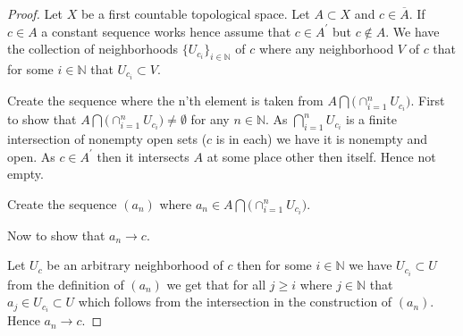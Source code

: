 \documentclass{amsart}
\theoremstyle{plain}
\theoremstyle{definition}
\theoremstyle{remark}
\begin{document}
\begin{proof}
    
    Let $X$ be a first countable topological space. Let $A\subset X$ and $c\in \overline A$. If $c\in A$ a constant sequence works hence assume that $c\in A^\prime$ but $c\not \in A$. We have the collection of neighborhoods $\{U_{c_i}\}_{i\in \mathbb{N}}$ of $c$ where any neighborhood $V$ of $c$ that for some $i\in \mathbb{N}$ that $U_{c_i}\subset V$.

    Create the sequence where the n'th element is taken from $A\bigcap \big(\cap_{i=1}^n U_{c_i} \big)$. First to show that $A\bigcap \big(\cap_{i=1}^n U_{c_i} \big)\not = \emptyset$ for any $n\in \mathbb{N}$. As $\bigcap_{i=1}^nU_{c_i}$ is a finite intersection of nonempty open sets  ($c$ is in each) we have it is nonempty and open. As $c\in A^\prime$  then it intersects $A$ at some place other then itself. Hence not empty. 

    Create the sequence $(a_n)$ where $a_n \in A\bigcap \big( \cap _{i=1}^n U_{c_i}\big)$. 

    Now to show that $a_n\to c$. 

    Let $U_c$ be an arbitrary neighborhood of $c$ then for some $i\in \mathbb{N}$ we have $U_{c_i}\subset U$ from the definition of $(a_n)$ we get that for all $j\geq i$ where $j\in \mathbb{N}$ that $a_j\in U_{c_i}\subset U$ which follows from the intersection in the construction of $(a_n)$. Hence $a_n\to c$.
\end{proof}
\end{document}
